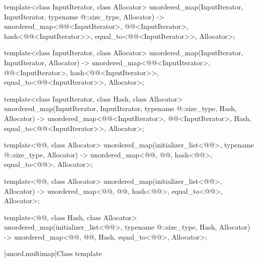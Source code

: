 \documentclass{wg21}
\begin{document}
\begin{codeblock}
{template<class InputIterator, class Allocator>
unordered_map(InputIterator, InputIterator, typename @\seebelow@::size_type, Allocator)
-> unordered_map<@@<InputIterator>, @@<InputIterator>,
hash<@@<InputIterator>>,
equal_to<@@<InputIterator>>, Allocator>;

template<class InputIterator, class Allocator>
unordered_map(InputIterator, InputIterator, Allocator)
-> unordered_map<@@<InputIterator>, @@<InputIterator>,
hash<@@<InputIterator>>,
equal_to<@@<InputIterator>>, Allocator>;

template<class InputIterator, class Hash, class Allocator>
unordered_map(InputIterator, InputIterator, typename @\seebelow@::size_type, Hash, Allocator)
-> unordered_map<@@<InputIterator>, @@<InputIterator>, Hash,
equal_to<@@<InputIterator>>, Allocator>;

template<@@, class Allocator>
unordered_map(initializer_list<@@>, typename @\seebelow@::size_type,
Allocator)
-> unordered_map<@@, @@, hash<@@>, equal_to<@@>, Allocator>;

template<@@, class Allocator>
unordered_map(initializer_list<@@>, Allocator)
-> unordered_map<@@, @@, hash<@@>, equal_to<@@>, Allocator>;

template<@@, class Hash, class Allocator>
unordered_map(initializer_list<@@>, typename @\seebelow@::size_type, Hash,
Allocator)
-> unordered_map<@@, @@, Hash, equal_to<@@>, Allocator>;
}
\end{codeblock}

[unord.multimap]{Class template }%
\end{document}
